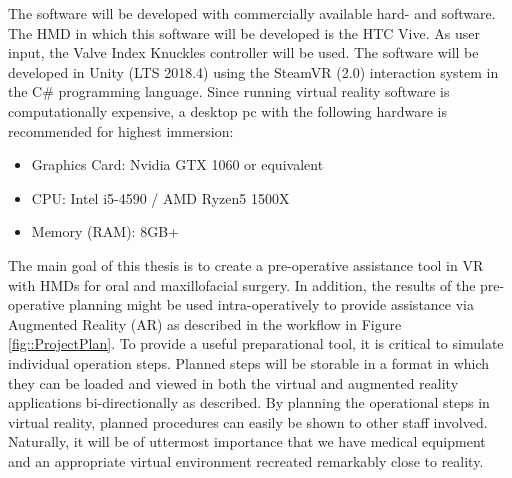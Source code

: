 The software will be developed with commercially available hard- and software.
The HMD in which this software will be developed is the HTC Vive.
As user input, the Valve Index Knuckles controller will be used.
The software will be developed in Unity (LTS 2018.4) using the SteamVR (2.0) interaction system in the C\# programming language.
Since running virtual reality software is computationally expensive, a desktop pc with the following hardware is recommended for highest immersion:

\begin{itemize}
    \item Graphics Card: Nvidia GTX 1060 or equivalent
    \item CPU: Intel i5-4590 / AMD Ryzen5 1500X
    \item Memory (RAM): 8GB+
\end{itemize}

The main goal of this thesis is to create a pre-operative assistance tool in VR with HMDs for oral and maxillofacial surgery. 
In addition, the results of the pre-operative planning might be used intra-operatively to provide assistance via Augmented Reality (AR) as described in the workflow in Figure \ref{fig::ProjectPlan}.
To provide a useful preparational tool, it is critical to simulate individual operation steps.
Planned steps will be storable in a format in which they can be loaded and viewed in both the virtual and augmented reality applications bi-directionally as described.
By planning the operational steps in virtual reality, planned procedures can easily be shown to other staff involved.
Naturally, it will be of uttermost importance that we have medical equipment and an appropriate virtual environment recreated remarkably close to reality.

